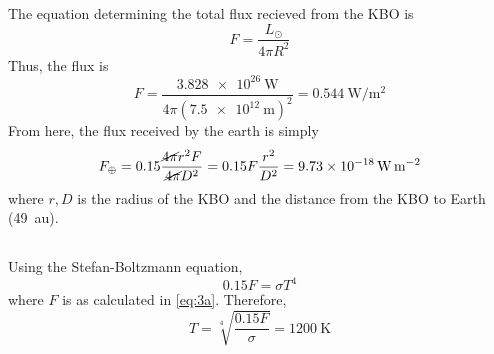 \documentclass{article}
\begin{document}
\subsection{}

The equation determining the total flux recieved from the KBO is
\begin{equation}
    F = \frac{L_\odot}{4 \pi R^2}
\end{equation}
Thus, the flux is
\begin{equation} \label{eq:3a}
    F = \frac{\SI{3.828e+26}{\watt}}{4 \pi (\SI{7.5e+12}{\meter})^2} = \SI{0.544}{\watt\per\meter\squared}
\end{equation}
From here, the flux received by the earth is simply
\begin{equation}
    F_\oplus = 0.15 \frac{\cancel{4 \pi} r^2 F}{ \cancel{4 \pi} D^2} = 0.15F \frac{r^2}{D^2} = \SI{9.73e-18}{\watt\per\meter\squared}
\end{equation}
where \(r, D\) is the radius of the KBO and the distance from the KBO to Earth (\SI{49}{\astronomicalunit}).

\subsection{}

Using the Stefan-Boltzmann equation,
\begin{equation}
    0.15F = \sigma T^4
\end{equation}
where \(F\) is as calculated in \autoref{eq:3a}.
Therefore,
\begin{equation}
    T = \sqrt[4]{\frac{0.15F}{\sigma}} = \SI{1200}{\kelvin}
\end{equation}

\subsection{}
\end{document}
